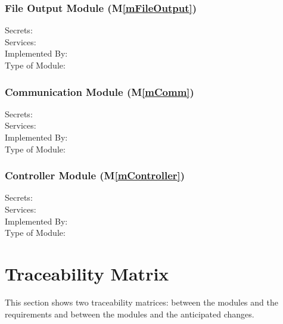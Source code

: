 \documentclass[12pt, titlepage]{article}
\newcommand{\mref}[1]{M\ref{#1}}
\begin{document}
\subsubsection{File Output Module (\mref{mFileOutput})}

\begin{description}
\item[Secrets:]
\item[Services:]
\item[Implemented By:]
\item[Type of Module:] 
  
\end{description}

\subsubsection{Communication Module (\mref{mComm})}

\begin{description}
\item[Secrets:]
\item[Services:]
\item[Implemented By:]
\item[Type of Module:] 
  
\end{description}

\subsubsection{Controller Module (\mref{mController})}

\begin{description}
\item[Secrets:]
\item[Services:]
\item[Implemented By:]
\item[Type of Module:] 
  
\end{description}

\section{Traceability Matrix} \label{SecTM}

This section shows two traceability matrices: between the modules and the
requirements and between the modules and the anticipated changes.
\end{document}

